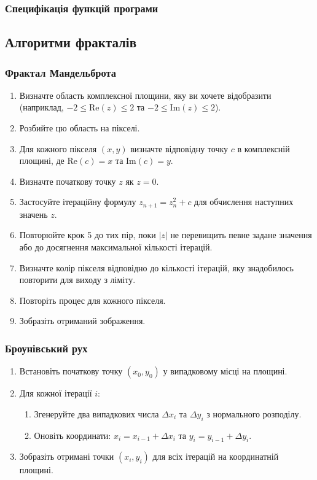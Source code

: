 \documentclass[oneside,14pt]{extarticle}
\begin{document}
\begin{normalsize}
	\subsubsection{Специфікація функцій програми}
	
	
	\subsection{Алгоритми фракталів}
	\subsubsection{Фрактал Мандельброта}
	\begin{enumerate}
		\item Визначте область комплексної площини, яку ви хочете відобразити (наприклад, $-2 \leq \text{Re}(z) \leq 2$ та $-2 \leq \text{Im}(z) \leq 2$).
		\item Розбийте цю область на пікселі.
		\item Для кожного пікселя $(x, y)$ визначте відповідну точку $c$ в комплексній площині, де $\text{Re}(c) = x$ та $\text{Im}(c) = y$.
		\item Визначте початкову точку $z$ як $z = 0$.
		\item Застосуйте ітераційну формулу $z_{n+1} = z_n^2 + c$ для обчислення наступних значень $z$.
		\item Повторюйте крок 5 до тих пір, поки $|z|$ не перевищить певне задане значення або до досягнення максимальної кількості ітерацій.
		\item Визначте колір пікселя відповідно до кількості ітерацій, яку знадобилось повторити для виходу з ліміту.
		\item Повторіть процес для кожного пікселя.
		\item Зобразіть отриманий зображення.
	\end{enumerate}
	
	\subsubsection{Броунівський рух}
	\begin{enumerate}
		\item Встановіть початкову точку $(x_0, y_0)$ у випадковому місці на площині.
		\item Для кожної ітерації $i$:
		\begin{enumerate}
			\item Згенеруйте два випадкових числа $\Delta x_i$ та $\Delta y_i$ з нормального розподілу.
			\item Оновіть координати: $x_i = x_{i-1} + \Delta x_i$ та $y_i = y_{i-1} + \Delta y_i$.
		\end{enumerate}
		\item Зобразіть отримані точки $(x_i, y_i)$ для всіх ітерацій на координатній площині.
	\end{enumerate}
	

\end{normalsize}
\end{document}
